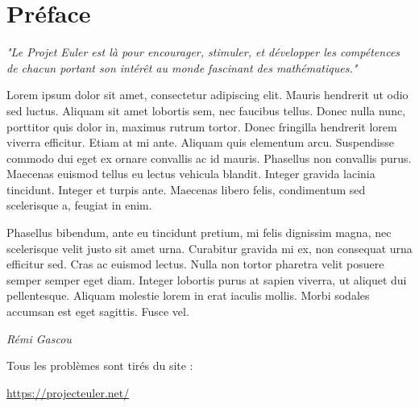\section*{Préface} 

\begin{center}
    
    \LARGE{\textit{"Le Projet Euler est là pour encourager, stimuler, et développer les compétences de chacun portant son intérêt au monde fascinant des mathématiques."}}
    
\end{center}

Lorem ipsum dolor sit amet, consectetur adipiscing elit. Mauris hendrerit ut odio sed luctus. Aliquam sit amet lobortis sem, nec faucibus tellus. Donec nulla nunc, porttitor quis dolor in, maximus rutrum tortor. Donec fringilla hendrerit lorem viverra efficitur. Etiam at mi ante. Aliquam quis elementum arcu. Suspendisse commodo dui eget ex ornare convallis ac id mauris. Phasellus non convallis purus. Maecenas euismod tellus eu lectus vehicula blandit. Integer gravida lacinia tincidunt. Integer et turpis ante. Maecenas libero felis, condimentum sed scelerisque a, feugiat in enim.


Phasellus bibendum, ante eu tincidunt pretium, mi felis dignissim magna, nec scelerisque velit justo sit amet urna. Curabitur gravida mi ex, non consequat urna efficitur sed. Cras ac euismod lectus. Nulla non tortor pharetra velit posuere semper semper eget diam. Integer lobortis purus at sapien viverra, ut aliquet dui pellentesque. Aliquam molestie lorem in erat iaculis mollis. Morbi sodales accumsan est eget sagittis. Fusce vel.



\begin{flushright}
    \textit{{Rémi Gascou}}
\end{flushright}

\vspace{5cm}

\begin{center}
    Tous les problèmes sont tirés du site :
    
    \href{https://projecteuler.net/}{https://projecteuler.net/}
\end{center}